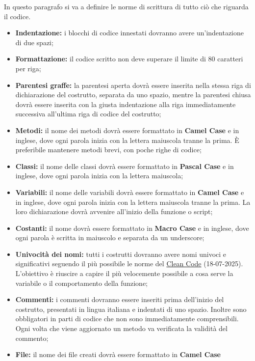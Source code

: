 \label{ref:stile}
In questo paragrafo si va a definire le norme di scrittura di tutto ciò che riguarda il codice.
\begin{itemize}
    \item \textbf{Indentazione:} i blocchi di codice innestati dovranno avere un’indentazione di due spazi;
    \item \textbf{Formattazione:} il codice scritto non deve superare il limite di 80 caratteri per riga;
    \item \textbf{Parentesi graffe:} la parentesi aperta dovrà essere inserita nella stessa riga di dichiarazione del
    costrutto, separata da uno spazio, mentre la parentesi chiusa dovrà essere inserita con la giusta
    indentazione alla riga immediatamente successiva all’ultima riga di codice del costrutto;
    \item \textbf{Metodi:} il nome dei metodi dovrà essere formattato in \textbf{Camel Case} e in inglese, dove ogni parola inizia con la lettera maiuscola tranne la prima.
    È preferibile mantenere metodi brevi, con poche righe di codice;
    \item \textbf{Classi:} il nome delle classi dovrà essere formattato in \textbf{Pascal Case} e in inglese, dove ogni parola inizia con la lettera maiuscola;
    \item \textbf{Variabili:} il nome delle variabili dovrà essere formattato in \textbf{Camel Case} e in inglese, dove ogni parola inizia con la lettera maiuscola tranne la prima.
    La loro dichiarazione dovrà avvenire all’inizio della funzione o script;
    \item \textbf{Costanti:} il nome dovrà essere formattato in \textbf{Macro Case} e in inglese, dove ogni parola è scritta in maiuscolo e separata da un underscore;
    \item \textbf{Univocità dei nomi:} tutti i costrutti dovranno avere nomi univoci e significativi seguendo il più possibile le norme del \href{https://medium.com/@pabashani.herath/clean-code-naming-conventions-4cac223de3c6#77bb}{Clean Code} (18-07-2025).\\
    L'obiettivo è riuscire a capire il più velocemente possibile a cosa serve la variabile o il comportamento della funzione;
    \item \textbf{Commenti:} i commenti dovranno essere inseriti prima dell’inizio del costrutto, presentati in lingua
    italiana e indentati di uno spazio. Inoltre sono obbligatori in parti di codice che non sono immediatamente comprensibili.
    Ogni volta che viene aggiornato un metodo va verificata la validità del commento;
    \item \textbf{File:} il nome dei file creati dovrà essere formattato in \textbf{Camel Case}
\end{itemize}

